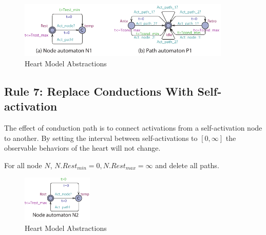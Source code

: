 \begin{figure}[!h]
		\centering
		\includegraphics[width=0.9\textwidth]{figs/rule5.pdf}
		\caption{\small Heart Model Abstractions}
		\label{fig:rule5}
\end{figure}

\subsection{Rule 7: Replace Conductions With Self-activation}
The effect of conduction path is to connect activations from a self-activation node to another. By setting the interval between self-activations to $[0,\infty]$ the observable behaviors of the heart will not change.

For all node $N$, $N.Rest_{min}=0,N.Rest_{max}=\infty$ and delete all paths.
\begin{figure}[!h]
		\centering
		\includegraphics[width=0.3\textwidth]{figs/rule6.pdf}
		\caption{\small Heart Model Abstractions}
		\label{fig:rule6}
\end{figure}

